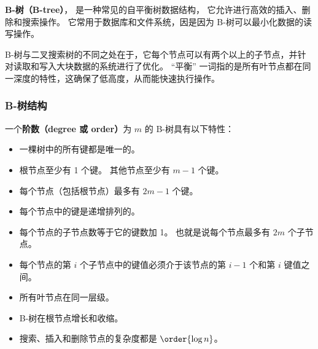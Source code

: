 
\begin{issues}
\issueDraft
\issueAi
\end{issues}


\textbf{B-树（B-tree）}， 是一种常见的自平衡树数据结构， 它允许进行高效的插入、删除和搜索操作。 它常用于数据库和文件系统，因是因为 B-树可以最小化数据的读写操作。

B-树与二叉搜索树的不同之处在于，它每个节点可以有两个以上的子节点，并针对读取和写入大块数据的系统进行了优化。 “平衡” 一词指的是所有叶节点都在同一深度的特性，这确保了低高度，从而能快速执行操作。

\subsubsection{B-树结构}
一个\textbf{阶数（degree 或 order）}为 $m$ 的 B-树具有以下特性：
\begin{itemize}
\item 一棵树中的所有键都是唯一的。
\item 根节点至少有 1 个键。 其他节点至少有 $m-1$ 个键。
\item 每个节点（包括根节点）最多有 $2m-1$ 个键。
\item 每个节点中的键是递增排列的。
\item 每个节点的子节点数等于它的键数加 1。 也就是说每个节点最多有 $2m$ 个子节点。
\item 每个节点的第 $i$ 个子节点中的键值必须介于该节点的第 $i-1$ 个和第 $i$ 键值之间。
\item 所有叶节点在同一层级。
\item B-树在根节点增长和收缩。
\item 搜索、插入和删除节点的复杂度都是 $\order{\log n}$。
\end{itemize}

